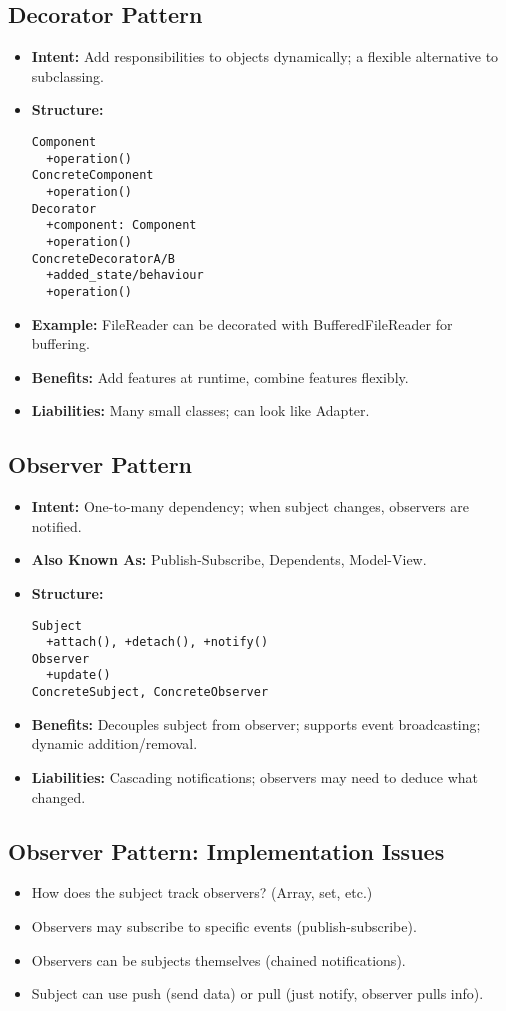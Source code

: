 \documentclass[11pt,a4paper]{article}
\begin{document}
\subsection*{Decorator Pattern}
\begin{itemize}
    \item \textbf{Intent:} Add responsibilities to objects dynamically; a flexible alternative to subclassing.
    \item \textbf{Structure:}
        \begin{verbatim}
Component
  +operation()
ConcreteComponent
  +operation()
Decorator
  +component: Component
  +operation()
ConcreteDecoratorA/B
  +added_state/behaviour
  +operation()
        \end{verbatim}
    \item \textbf{Example:} FileReader can be decorated with BufferedFileReader for buffering.
    \item \textbf{Benefits:} Add features at runtime, combine features flexibly.
    \item \textbf{Liabilities:} Many small classes; can look like Adapter.
\end{itemize}

\subsection*{Observer Pattern}
\begin{itemize}
    \item \textbf{Intent:} One-to-many dependency; when subject changes, observers are notified.
    \item \textbf{Also Known As:} Publish-Subscribe, Dependents, Model-View.
    \item \textbf{Structure:}
        \begin{verbatim}
Subject
  +attach(), +detach(), +notify()
Observer
  +update()
ConcreteSubject, ConcreteObserver
        \end{verbatim}
    \item \textbf{Benefits:} Decouples subject from observer; supports event broadcasting; dynamic addition/removal.
    \item \textbf{Liabilities:} Cascading notifications; observers may need to deduce what changed.
\end{itemize}

\subsection*{Observer Pattern: Implementation Issues}
\begin{itemize}
    \item How does the subject track observers? (Array, set, etc.)
    \item Observers may subscribe to specific events (publish-subscribe).
    \item Observers can be subjects themselves (chained notifications).
    \item Subject can use push (send data) or pull (just notify, observer pulls info).
\end{itemize}
\end{document}
